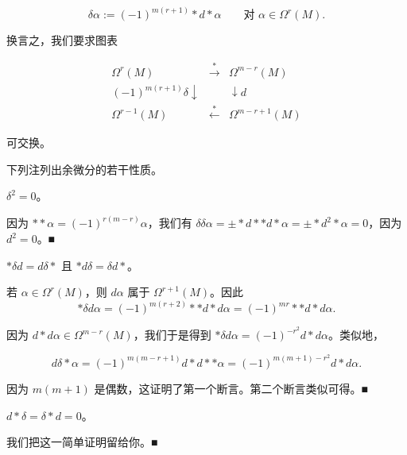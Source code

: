 \[
\delta\alpha := (-1)^{m(r+1)}\ast d\ast\alpha \qquad \text{对 } \alpha \in \Omega^{r}(M) .
\]

换言之，我们要求图表

\begin{equation*}
\begin{array}{ccc} \Omega^{r}(M) & \xrightarrow{\ast} & \Omega^{m-r}(M) \\ (-1)^{m(r+1)}\delta\downarrow & & \downarrow d \\ \Omega^{r-1}(M) & \xleftarrow{\ast} & \Omega^{m-r+1}(M) \end{array}
\end{equation*}

可交换。

下列注列出余微分的若干性质。

\begin{remark}

\begin{items}
\item

$ \delta^{2} = 0 $。

\proofhead
因为 $ \ast\ast\alpha = (-1)^{r(m-r)}\alpha $，我们有 $ \delta\delta\alpha = \pm\ast d\ast\ast d\ast\alpha = \pm\ast d^{2}\ast\alpha = 0 $，因为 $ d^{2} = 0 $。\nobreak\hspace{0.35em}■
\item

$ \ast\delta d = d\delta\ast $ 且 $ \ast d\delta = \delta d\ast $。

\proofhead
若 $ \alpha \in \Omega^{r}(M) $，则 $ d\alpha $ 属于 $ \Omega^{r+1}(M) $。因此
\[
\ast\delta d\alpha = (-1)^{m(r+2)}\ast\ast d\ast d\alpha = (-1)^{mr}\ast\ast d\ast d\alpha .
\]

因为 $ d\ast d\alpha \in \Omega^{m-r}(M) $，我们于是得到 $ \ast\delta d\alpha = (-1)^{-r^{2}}d\ast d\alpha $。类似地，

\[
d\delta\ast\alpha = (-1)^{m(m-r+1)}d\ast d\ast\ast\alpha = (-1)^{m(m+1)-r^{2}}d\ast d\alpha .
\]

因为 $ m(m+1) $ 是偶数，这证明了第一个断言。第二个断言类似可得。\nobreak\hspace{0.35em}■

\item

$ d\ast\delta = \delta\ast d = 0 $。

\proofhead
我们把这一简单证明留给你。\nobreak\hspace{0.35em}■
\item


\end{items}
\end{remark}
